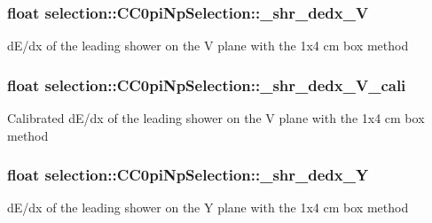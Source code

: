 \subsubsection[{\texorpdfstring{\+\_\+shr\+\_\+dedx\+\_\+V}{_shr_dedx_V}}]{\setlength{\rightskip}{0pt plus 5cm}float selection\+::\+C\+C0pi\+Np\+Selection\+::\+\_\+shr\+\_\+dedx\+\_\+V\hspace{0.3cm}{\ttfamily [private]}}\hypertarget{classselection_1_1CC0piNpSelection_a392211f6d023d92bf113c20098c5e7fe}{}\label{classselection_1_1CC0piNpSelection_a392211f6d023d92bf113c20098c5e7fe}
d\+E/dx of the leading shower on the V plane with the 1x4 cm box method 
\subsubsection[{\texorpdfstring{\+\_\+shr\+\_\+dedx\+\_\+\+V\+\_\+cali}{_shr_dedx_V_cali}}]{\setlength{\rightskip}{0pt plus 5cm}float selection\+::\+C\+C0pi\+Np\+Selection\+::\+\_\+shr\+\_\+dedx\+\_\+\+V\+\_\+cali\hspace{0.3cm}{\ttfamily [private]}}\hypertarget{classselection_1_1CC0piNpSelection_a0ef852fb0ecd8a3b6f871ed765be12da}{}\label{classselection_1_1CC0piNpSelection_a0ef852fb0ecd8a3b6f871ed765be12da}
Calibrated d\+E/dx of the leading shower on the V plane with the 1x4 cm box method 
\subsubsection[{\texorpdfstring{\+\_\+shr\+\_\+dedx\+\_\+Y}{_shr_dedx_Y}}]{\setlength{\rightskip}{0pt plus 5cm}float selection\+::\+C\+C0pi\+Np\+Selection\+::\+\_\+shr\+\_\+dedx\+\_\+Y\hspace{0.3cm}{\ttfamily [private]}}\hypertarget{classselection_1_1CC0piNpSelection_a1af96c31bd3afe4b111f429927bbff1c}{}\label{classselection_1_1CC0piNpSelection_a1af96c31bd3afe4b111f429927bbff1c}
d\+E/dx of the leading shower on the Y plane with the 1x4 cm box method 

